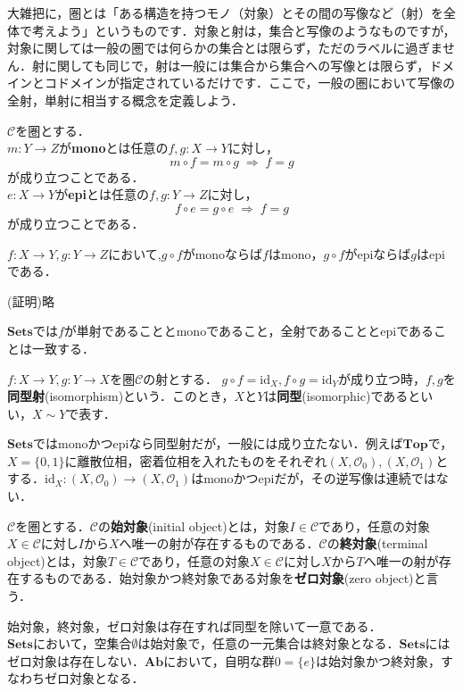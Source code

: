 大雑把に，圏とは「ある構造を持つモノ（対象）とその間の写像など（射）を全体で考えよう」というものです．対象と射は，集合と写像のようなものですが，対象に関しては一般の圏では何らかの集合とは限らず，ただのラベルに過ぎません．射に関しても同じで，射は一般には集合から集合への写像とは限らず，ドメインとコドメインが指定されているだけです．ここで，一般の圏において写像の全射，単射に相当する概念を定義しよう．
\begin{defi}
$\mathcal{C}$を圏とする．\\
$m:Y \to Z$が{\bf mono}とは任意の$f,g:X \to Y$に対し，
\[ m \circ f = m \circ g  \; \Rightarrow \; f = g \]
が成り立つことである．\\
$e:X \to Y$が{\bf epi}とは任意の$f,g:Y \to Z$に対し，
\[ f \circ e = g \circ e \; \Rightarrow \; f = g \]
が成り立つことである．
\end{defi} \proofend

\begin{prop}
$f:X \to Y , g:Y \to Z$において,$g \circ f$がmonoならば$f$はmono，$g \circ f$がepiならば$g$はepiである．
\end{prop}
(証明)\;略\proofend

$\mathbf{Sets}$では$f$が単射であることとmonoであること，全射であることとepiであることは一致する．

\begin{defi}
$f: X \to Y , g: Y \to X$を圏$\mathcal{C}$の射とする．%
$g \circ f = \mathrm{id}_X , f \circ g = \mathrm{id}_Y$が成り立つ時，$f,g$を{\bf 同型射}(isomorphism)という．このとき，$X$と$Y$は{\bf 同型}(isomorphic)であるといい，$X \sim Y$で表す．
\end{defi} \proofend
$\mathbf{Sets}$ではmonoかつepiなら同型射だが，一般には成り立たない．例えば$\mathbf{Top}$で，$X=\{0,1\}$に離散位相，密着位相を入れたものをそれぞれ$(X,\mathscr{O}_0),(X,\mathscr{O}_1)$とする．$\mathrm{id}_X : (X,\mathscr{O}_0) \to (X,\mathscr{O}_1)$はmonoかつepiだが，その逆写像は連続ではない．

\begin{defi}
$\mathcal{C}$を圏とする．$\mathcal{C}$の{\bf 始対象}(initial object)とは，対象$I \in \mathcal{C}$であり，任意の対象$X \in \mathcal{C}$に対し$I$から$X$へ唯一の射が存在するものである．$\mathcal{C}$の{\bf 終対象}(terminal object)とは，対象$T \in \mathcal{C}$であり，任意の対象$X \in \mathcal{C}$に対し$X$から$T$へ唯一の射が存在するものである．始対象かつ終対象である対象を{\bf ゼロ対象}(zero object)と言う．
\end{defi} \proofend
始対象，終対象，ゼロ対象は存在すれば同型を除いて一意である．\\
$\mathbf{Sets}$において，空集合$\emptyset$は始対象で，任意の一元集合は終対象となる．$\mathbf{Sets}$にはゼロ対象は存在しない．$\mathbf{Ab}$において，自明な群$0 = \{e\}$は始対象かつ終対象，すなわちゼロ対象となる．


